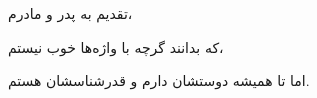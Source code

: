 \newpage
{
\vspace*{0.5in}
\Nastaliq
تقدیم به پدر و مادرم،

\hspace{1in}که بدانند گرچه با واژه‌ها خوب نیستم،

\hspace{1in}اما تا همیشه دوستشان دارم و قدرشناسشان هستم.
}
\newpage\null\thispagestyle{empty}\newpage
